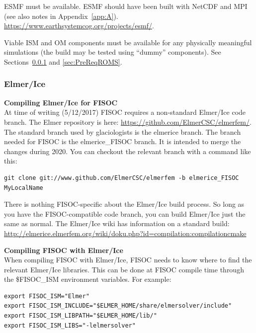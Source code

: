 \documentclass[11pt]{article}
\begin{document}
ESMF must be available. ESMF should have been built with NetCDF and MPI 
(see also notes in Appendix~\ref{app:A}). \\
\url{https://www.earthsystemcog.org/projects/esmf/}.


Viable ISM and OM components must be available for any physically meaningful simulations
(the build may be tested using ``dummy'' components).  
See Sections~\ref{sec:PreReqElmer} and \ref{sec:PreReqROMS}.


\subsubsection{Elmer/Ice}
\label{sec:PreReqElmer}

\textbf{Compiling Elmer/Ice for FISOC} \\
At time of writing (5/12/2017) FISOC requires a non-standard Elmer/Ice 
code branch. 
The Elmer repository is here:
\url{https://github.com/ElmerCSC/elmerfem/}.
The standard branch used by glaciologists is the elmerice branch. 
The branch needed for FISOC is the elmerice\_FISOC branch. 
It is intended to merge the changes during 2020.
You can checkout the relevant branch with a command like this:
\begin{lstlisting}
git clone git://www.github.com/ElmerCSC/elmerfem -b elmerice_FISOC MyLocalName
\end{lstlisting}

There is nothing FISOC-specific about the Elmer/Ice build process.  
So long as you have the FISOC-compatible code branch, you can build Elmer/Ice 
just the same as normal. 
The Elmer/Ice wiki has information on a standard build:
\url{http://elmerice.elmerfem.org/wiki/doku.php?id=compilation:compilationcmake}

\vspace{10pt}

\textbf{Compiling FISOC with Elmer/Ice}\\
When compiling FISOC with Elmer/Ice, FISOC needs to know where to 
find the relevant Elmer/Ice libraries.  
This can be done at FISOC compile time through the 
\$FISOC\_ISM
environment variables.  For example:

\begin{lstlisting}
export FISOC_ISM="Elmer"
export FISOC_ISM_INCLUDE="$ELMER_HOME/share/elmersolver/include"
export FISOC_ISM_LIBPATH="$ELMER_HOME/lib/"
export FISOC_ISM_LIBS="-lelmersolver"
\end{lstlisting}
\end{document}
